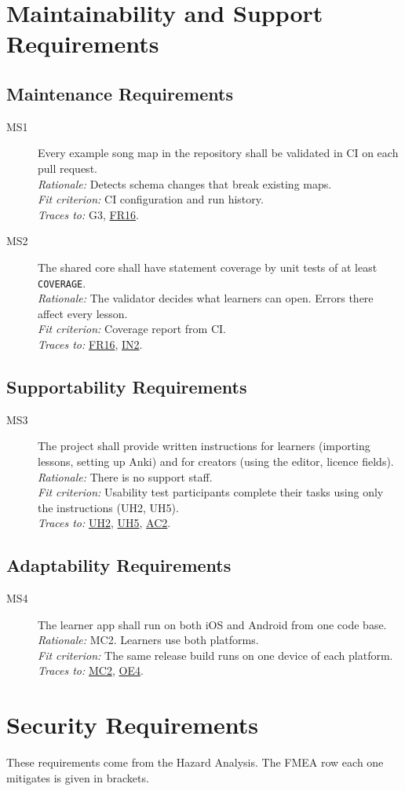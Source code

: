 \documentclass[12pt]{article}
\newcommand{\cn}[1]{\texttt{#1}}
\newcommand{\rat}[1]{\\\textit{Rationale:} #1}
\newcommand{\fit}[1]{\\\textit{Fit criterion:} #1}
\newcommand{\trace}[1]{\\\textit{Traces to:} #1}
\newcommand{\reqdef}[1]{\hypertarget{req:#1}{#1}}
\newcommand{\req}[1]{\hyperlink{req:#1}{#1}}
\begin{document}
\section{Maintainability and Support Requirements}
\subsection{Maintenance Requirements} \label{SecMaintenance}
\begin{description}
\item[\reqdef{MS1}] Every example song map in the repository shall be validated in CI on
each pull request.
\rat{Detects schema changes that break existing maps.}
\fit{CI configuration and run history.}
\trace{G3, \req{FR16}.}

\item[\reqdef{MS2}] The shared core shall have statement coverage by unit tests of at least
\cn{COVERAGE}.
\rat{The validator decides what learners can open. Errors there affect every
lesson.}
\fit{Coverage report from CI.}
\trace{\req{FR16}, \req{IN2}.}
\end{description}

\subsection{Supportability Requirements}
\begin{description}
\item[\reqdef{MS3}] The project shall provide written instructions for learners
(importing lessons, setting up Anki) and for creators (using the editor,
licence fields).
\rat{There is no support staff.}
\fit{Usability test participants complete their tasks using only the
instructions (UH2, UH5).}
\trace{\req{UH2}, \req{UH5}, \req{AC2}.}
\end{description}

\subsection{Adaptability Requirements}
\begin{description}
\item[\reqdef{MS4}] The learner app shall run on both iOS and Android from one code
base.
\rat{MC2. Learners use both platforms.}
\fit{The same release build runs on one device of each platform.}
\trace{\req{MC2}, \req{OE4}.}
\end{description}

\section{Security Requirements}
These requirements come from the Hazard Analysis. The FMEA row each one
mitigates is given in brackets.
\end{document}
